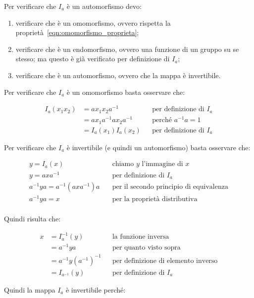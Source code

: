 \begin{soluzione}
	Per verificare che $I_a$ è un automorfismo devo:
	
	\begin{enumerate}
		\item verificare che è un omomorfismo, ovvero rispetta la proprietà~\eqref{eqn:omomorfismo_proprieta};
		\item verificare che è un endomorfismo, ovvero una funzione di un gruppo su se stesso; ma questo è già verificato per definizione di $I_a$;
		\item verificare che è un automorfismo, ovvero che la mappa è invertibile.
	\end{enumerate}

	Per verificare che $I_a$ è un omomorfismo basta osservare che:
	
	\begin{align}
		I_a(x_1x_2) &= ax_1x_2a^{-1} && \text{per definizione di $I_a$} \\
		&= ax_1a^{-1}ax_2a^{-1} && \text{perché $a^{-1}a = 1$} \\
		&= I_a(x_1)I_a(x_2) && \text{per definizione di $I_a$}
	\end{align}

	Per verificare che $I_a$ è invertibile (e quindi un automorfismo) basta osservare che:
	
	\begin{align}
		y = I_a(x) & \quad\text{chiamo $y$ l'immagine di $x$} \\
		y = axa^{-1} & \quad\text{per definizione di $I_a$} \\
		a^{-1}ya = a^{-1}(axa^{-1})a & \quad\text{per il secondo principio di equivalenza} \\
		a^{-1}ya = x & \quad\text{per la proprietà distributiva} \\
	\end{align}

	Quindi risulta che:
	
	\begin{align}
		x &= I_a^{-1}(y) && \text{la funzione inversa} \\
		&= a^{-1}ya && \text{per quanto visto sopra} \\
		&= a^{-1}y(a^{-1})^{-1} && \text{per definizione di elemento inverso} \\
		&= I_{a^{-1}}(y) && \text{per definizione di $I_a$}
	\end{align}

	Quindi la mappa $I_a$ è invertibile perché:
	

\end{soluzione}
